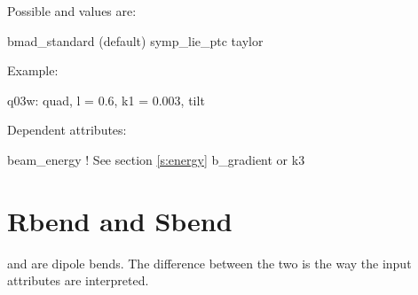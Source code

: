 \vskip0.2in \noindent
Possible  and  values are:
\vskip 0.01in
\begin{example}
  bmad\_standard  (default)
  symp\_lie\_ptc
  taylor
\end{example}

\vskip0.2in \noindent
Example:
\begin{example}
  q03w: quad, l = 0.6, k1 = 0.003, tilt
\end{example}

\vskip0.2in \noindent
Dependent attributes:
\begin{example}
  beam\_energy  ! See section \ref{s:energy}
  b\_gradient or k3
\end{example}

\section{Rbend and Sbend}
\label{s:bend}

 and  are dipole bends. The difference between
the two is the way the input attributes are interpreted.

